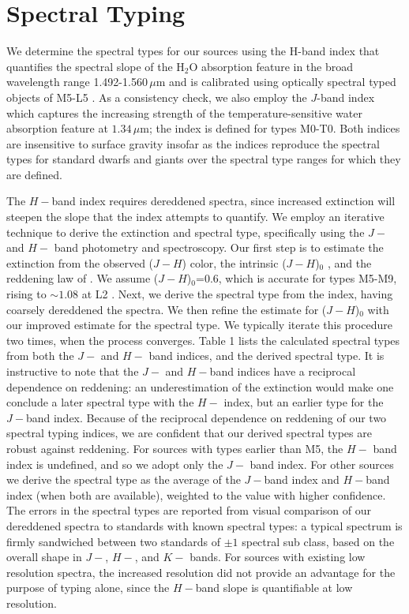 \documentclass[11pt,twoside]{article}
\begin{document}
\section{Spectral Typing}
We determine the spectral types for our sources using the H-band index that quantifies the spectral slope of the H$_{2}$O absorption feature in the broad wavelength range 1.492-1.560$\, \mu$m and is calibrated using optically spectral typed objects of M5-L5 \citep{allers07}.  As a consistency check, we also employ the \citet{slesnick04} $J$-band index which captures the increasing strength of the temperature-sensitive water absorption feature at $1.34 \,\mu$m; the index is defined for types M0-T0.  Both indices are insensitive to surface gravity \citep{slesnick04, allers07} insofar as the indices reproduce the spectral types for standard dwarfs and giants over the spectral type ranges for which they are defined.

The \citet{allers07} $H-$band index requires dereddened spectra, since increased extinction will steepen the slope that the index attempts to quantify.  We employ an iterative technique to derive the extinction and spectral type, specifically using the $J-$ and $H-$ band photometry and spectroscopy.  Our first step is to estimate the extinction from the observed ($J-H$) color, the intrinsic ($J-H$)$_{0}$ \citep{patten06}, and the reddening law of \citet{fitzpatrick1999}.  We assume ($J-H$)$_{0}$=0.6, which is accurate for types M5-M9, rising to $\sim1.08$ at L2 \citep{patten06}.  Next, we derive the spectral type from the \citet{allers07} index, having coarsely dereddened the spectra.  We then refine the estimate for ($J-H$)$_{0}$ with our improved estimate for the spectral type.  We typically iterate this procedure two times, when the process converges.  Table 1 lists the calculated spectral types from both the $J-$ and $H-$ band indices, and the derived spectral type.  It is instructive to note that the $J-$ and $H-$band indices have a reciprocal dependence on reddening: an underestimation of the extinction would make one conclude a later spectral type with the $H-$ index, but an earlier type for the $J-$band index.  Because of the reciprocal dependence on reddening of our two spectral typing indices, we are confident that our derived spectral types are robust against reddening.  For sources with types earlier than M5, the $H-$ band index is undefined, and so we adopt only the $J-$ band index.  For other sources we derive the spectral type as the average of the $J-$band index and $H-$band index (when both are available), weighted to the value with higher confidence.  The errors in the spectral types are reported from visual comparison of our dereddened spectra to standards with known spectral types: a typical spectrum is firmly sandwiched between two standards of $\pm1$ spectral sub class, based on the overall shape in $J-$, $H-$, and $K-$ bands.  For sources with existing low resolution spectra, the increased resolution did not provide an advantage for the purpose of typing alone, since the $H-$band slope is quantifiable at low resolution.  
\end{document}
